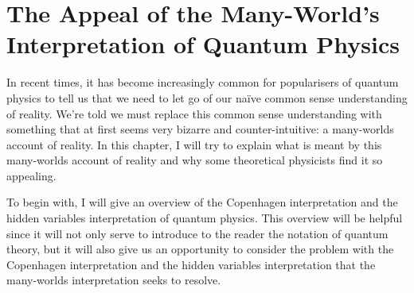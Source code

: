 \begin{comment}
    \section{Introduction}
    \emph{}
    
    Common sense is very often underated. This is especially so in the light of modern physics. Not infrequently, one hears people claim that modern physics shows us that reality is fundamentally weird and that we must discard our naive common sense intuitions. Now perhaps these people are right, but if we are to accept their claims, they ought to have really compelling reasons. The usual response to an argument that results in wierd or seemingly absurd conclusions is to question the argument's premises or examine whether the argument is logically valid. 
\end{comment}
    \chapter{The Appeal of the Many-World's Interpretation of Quantum Physics}
    In recent times, it has become increasingly common for popularisers of quantum physics to tell us that we need to let go of our naïve common sense understanding of reality. We're told we must replace this common sense understanding with something that at first seems very bizarre and counter-intuitive: a many-worlds account of reality. In this chapter, I will try to explain what is meant by this many-worlds account of reality and why some theoretical physicists find it so appealing.
    
    To begin with, I will give an overview of the Copenhagen interpretation and the hidden variables interpretation of quantum physics. This overview will be helpful since it will not only serve to introduce to the reader the notation of quantum theory, but it will also give us an opportunity to consider the problem with the Copenhagen interpretation and the hidden variables interpretation that the many-worlds interpretation seeks to resolve. 
